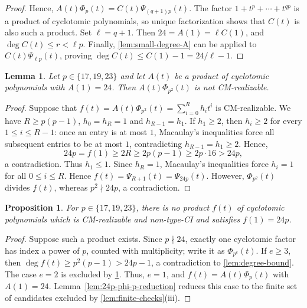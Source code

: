 \documentclass[11pt,a4paper]{amsart}
\newtheorem{proposition}[proposition]{Proposition}
\newtheorem{lemma}[lemma]{Lemma}
\theoremstyle{definition}
\theoremstyle{remark}
\begin{document}
\begin{proof}
Hence, $A(t)\Phi_p(t)=C(t)\Psi_{(q+1)p}(t)$. The factor $1+t^p+\cdots+t^{qp}$ is a product of cyclotomic polynomials, so unique factorization shows that $C(t)$ is also such a product. Set $\ell=q+1$. Then $24=A(1)=\ell C(1)$, and $\deg C(t)\le r<\ell p$. Finally, \cref{lem:small-degree-A} can be applied to $C(t)\Psi_{\ell p}(t)$, proving $\deg C(t)\le C(1)-1=24/\ell-1$.
\end{proof}

\begin{lemma}\label{lem:24p-phi-p2}
Let $p\in\{17,19,23\}$ and let $A(t)$ be a product of cyclotomic polynomials with $A(1)=24$. Then $A(t)\Phi_{p^2}(t)$ is not CM-realizable.
\end{lemma}
\begin{proof}
Suppose that $f(t)=A(t)\Phi_{p^2}(t)=\sum_{i=0}^R h_it^i$ is CM-realizable. We have $R\ge p(p-1)$, $h_0=h_R=1$ and $h_{R-1}=h_1$. If $h_1\ge2$, then $h_i\ge2$ for every $1\le i\le R-1$: once an entry is at most $1$, Macaulay's inequalities force all subsequent entries to be at most $1$, contradicting $h_{R-1}=h_1\ge2$. Hence,
\[24p=f(1)\ge2R\ge2p(p-1) \geq 2p \cdot 16 >24p,\]
a contradiction. Thus $h_1\le1$. Since $h_R=1$, Macaulay's inequalities force $h_i=1$ for all $0\le i\le R$. Hence $f(t)=\Psi_{R+1}(t)=\Psi_{24p}(t)$. However, $\Phi_{p^2}(t)$ divides $f(t)$, whereas $p^2\nmid24p$, a contradiction.
\end{proof}

\begin{proposition}\label{prop:24p-small-primes}
For $p\in\{17,19,23\}$, there is no product $f(t)$ of cyclotomic polynomials which is CM-realizable and non-type-CI and satisfies $f(1)=24p$.
\end{proposition}
\begin{proof}
Suppose such a product exists. Since $p\nmid24$, exactly one cyclotomic factor has index a power of $p$, counted with multiplicity; write it as $\Phi_{p^e}(t)$. If $e\ge3$, then $\deg f(t)\ge p^2(p-1)>24p-1$, a contradiction to \cref{lem:degree-bound}. The case $e=2$ is excluded by \cref{lem:24p-phi-p2}. Thus, $e=1$, and $f(t)=A(t)\Phi_p(t)$ with $A(1)=24$. Lemma~\ref{lem:24p-phi-p-reduction} reduces this case to the finite set of candidates excluded by \cref{lem:finite-checks}\textup{(iii)}.
\end{proof}
\end{document}
